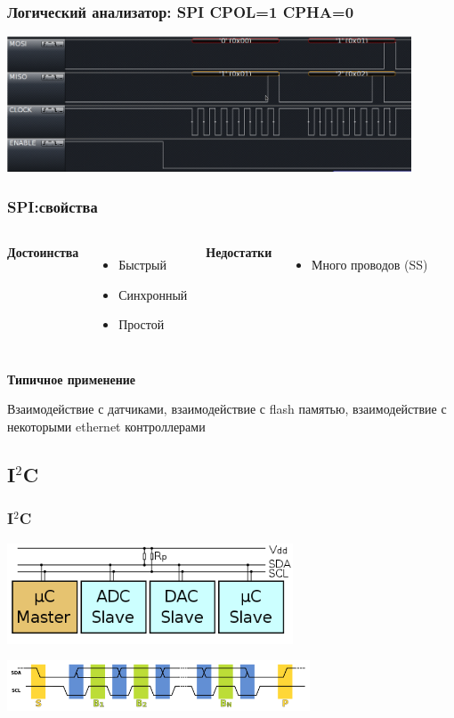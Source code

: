\begin{frame}
  \frametitle{Логический анализатор: SPI CPOL=1 CPHA=0}
  \includegraphics[width=12cm]{./slides/hardware_protocols/spi_proto_cpol1_cpha0.png}
\end{frame}


\begin{frame}
  \frametitle{SPI:свойства}
  \begin{columns}
    \column{4cm}
    \begin{center}
      {\bf\large Достоинства}
    \end{center}
    \begin{itemize}
       \item Быстрый
       \item Синхронный
       \item Простой
    \end{itemize}
    \column{4cm}
    \begin{center}
      {\bf\large Недостатки}
    \end{center}
    \begin{itemize}
       \item Много проводов (SS)
    \end{itemize}
  \end{columns}
  \begin{center}
    {\bf\large Типичное применение}
  \end{center}
  Взаимодействие с датчиками, взаимодействие с flash памятью, взаимодействие с некоторыми ethernet контроллерами
\end{frame}

\subsection{I$^2$C}   
\begin{frame}
  \frametitle{I$^2$C}
  \begin{center}
    \includegraphics[height=3cm]{./slides/hardware_protocols/I2C.png}
    \vspace{0.3cm}

    \includegraphics[height=1.5cm]{./slides/hardware_protocols/600px-I2C_data_transfer.png}
  \end{center}
\end{frame}

